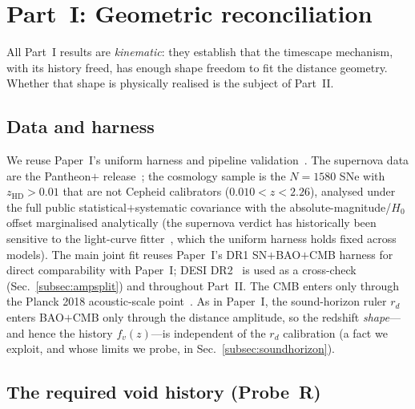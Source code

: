 \documentclass[aps,prd,twocolumn,nofootinbib,superscriptaddress,floatfix]{revtex4-2}
\newcommand{\Ho}{H_{0}}
\newcommand{\fvz}{f_{v}(z)}
\newcommand{\rd}{r_{d}}
\begin{document}
\section{Part~I: Geometric reconciliation}
\label{sec:reconcile}

All Part~I results are \emph{kinematic}: they establish that the timescape
mechanism, with its history freed, has enough shape freedom to fit the distance
geometry. Whether that shape is physically realised is the subject of Part~II.

\subsection{Data and harness}
\label{subsec:data}

We reuse Paper~I's uniform harness and pipeline validation~\cite{Paper1}. The
supernova data are the Pantheon$+$ release~\cite{Scolnic2022,Brout2022}; the
cosmology sample is the $N=1580$ SNe with $z_{\mathrm{HD}}>0.01$ that are not
Cepheid calibrators ($0.010<z<2.26$), analysed under the full public
statistical$+$systematic covariance with the absolute-magnitude/$\Ho$ offset
marginalised analytically (the supernova verdict has historically been sensitive
to the light-curve fitter~\cite{Smale2011}, which the uniform harness holds
fixed across models). The main joint fit reuses Paper~I's DR1 SN$+$BAO$+$CMB
harness for direct comparability with Paper~I; DESI DR2~\cite{DESIDR2,DESI2024} is
used as a cross-check (Sec.~\ref{subsec:ampsplit}) and throughout Part~II. The CMB
enters only through the Planck 2018 acoustic-scale point~\cite{Planck2018}. As in Paper~I, the sound-horizon ruler $\rd$ enters BAO$+$CMB
only through the distance amplitude, so the redshift \emph{shape}---and hence the
history $\fvz$---is independent of the $\rd$ calibration (a fact we exploit, and
whose limits we probe, in Sec.~\ref{subsec:soundhorizon}).

\subsection{The required void history (Probe~R)}
\label{subsec:probeR}
\end{document}
